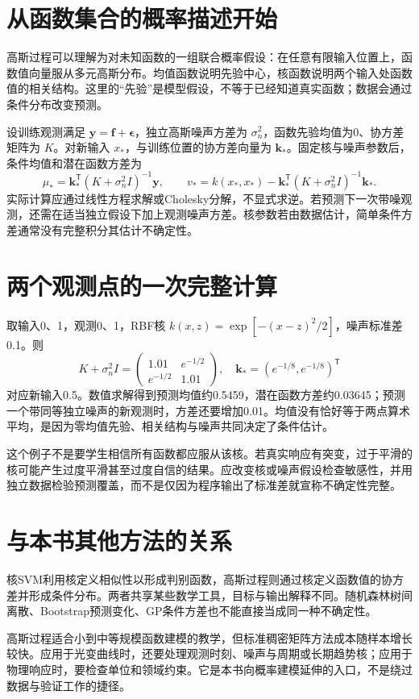 
\section{从函数集合的概率描述开始}
高斯过程可以理解为对未知函数的一组联合概率假设：在任意有限输入位置上，函数值向量服从多元高斯分布。均值函数说明先验中心，核函数说明两个输入处函数值的相关结构。这里的“先验”是模型假设，不等于已经知道真实函数；数据会通过条件分布改变预测。

设训练观测满足 $\mathbf y=\mathbf f+\boldsymbol\epsilon$，独立高斯噪声方差为 $\sigma_n^2$，函数先验均值为0、协方差矩阵为 $K$。对新输入 $x_*$，与训练位置的协方差向量为 $\mathbf k_*$。固定核与噪声参数后，条件均值和潜在函数方差为
\[
\mu_* = \mathbf k_*^\mathsf T(K+\sigma_n^2I)^{-1}\mathbf y,
\qquad
v_* = k(x_*,x_*)-\mathbf k_*^\mathsf T(K+\sigma_n^2I)^{-1}\mathbf k_*.
\]
实际计算应通过线性方程求解或Cholesky分解，不显式求逆。若预测下一次带噪观测，还需在适当独立假设下加上观测噪声方差。核参数若由数据估计，简单条件方差通常没有完整积分其估计不确定性。

\section{两个观测点的一次完整计算}
取输入0、1，观测0、1，RBF核 $k(x,z)=\exp[-(x-z)^2/2]$，噪声标准差0.1。则
\[
K+\sigma_n^2I=\begin{pmatrix}1.01&e^{-1/2}\\e^{-1/2}&1.01\end{pmatrix},
\quad\mathbf k_*=(e^{-1/8},e^{-1/8})^\mathsf T
\]
对应新输入0.5。数值求解得到预测均值约0.5459，潜在函数方差约0.03645；预测一个带同等独立噪声的新观测时，方差还要增加0.01。均值没有恰好等于两点算术平均，是因为零均值先验、相关结构与噪声共同决定了条件估计。

这个例子不是要学生相信所有函数都应服从该核。若真实响应有突变，过于平滑的核可能产生过度平滑甚至过度自信的结果。应改变核或噪声假设检查敏感性，并用独立数据检验预测覆盖，而不是仅因为程序输出了标准差就宣称不确定性完整。

\section{与本书其他方法的关系}
核SVM利用核定义相似性以形成判别函数，高斯过程则通过核定义函数值的协方差并形成条件分布。两者共享某些数学工具，目标与输出解释不同。随机森林树间离散、Bootstrap预测变化、GP条件方差也不能直接当成同一种不确定性。

高斯过程适合小到中等规模函数建模的教学，但标准稠密矩阵方法成本随样本增长较快。应用于光变曲线时，还要处理观测时刻、噪声与周期或长期趋势核；应用于物理响应时，要检查单位和领域约束。它是本书向概率建模延伸的入口，不是绕过数据与验证工作的捷径。
